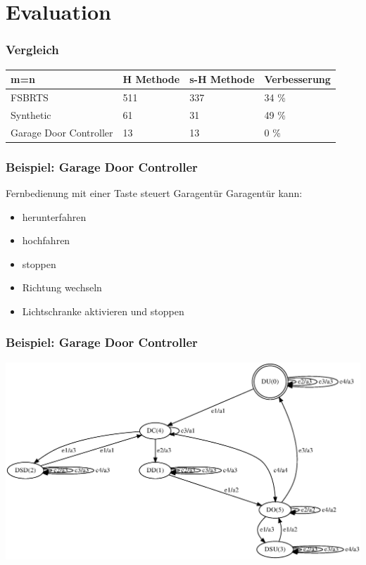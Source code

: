 \section{Evaluation}
\begin{frame}
    \frametitle{Vergleich}
    \begin{table}[]
    \centering
    \begin{tabular}{|l|l|l|l|}
    \hline
    m=n                    & H Methode & s-H Methode & Verbesserung \\\hline
    FSBRTS                 & 511       & 337         & 34 \%        \\
    Synthetic              & 61        & 31          & 49 \%        \\
    Garage Door Controller & 13        & 13          & 0 \%         \\
    \hline
    \end{tabular}
    \end{table}
    \end{frame}
    
    \begin{frame}
    \frametitle{Beispiel: Garage Door Controller}
    Fernbedienung mit einer Taste steuert Garagentür
    Garagentür kann:
    \begin{itemize}
        \item herunterfahren
        \item hochfahren
        \item stoppen
        \item Richtung wechseln
        \item Lichtschranke aktivieren und stoppen
    \end{itemize}
    
    \end{frame}
    \begin{frame}
    \frametitle{Beispiel: Garage Door Controller}
    \centering
    \includegraphics[width=1.15\textwidth]{images/gdc}
    
    \end{frame}
    
